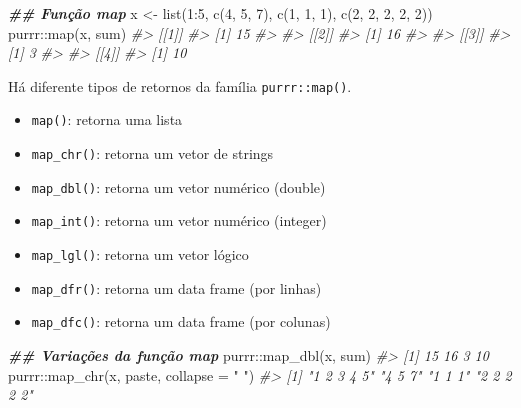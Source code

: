 \documentclass[
]{book}
\newenvironment{Shaded}{\begin{snugshade}}{\end{snugshade}}
\newcommand{\AttributeTok}[1]{\textcolor[rgb]{0.61,0.61,0.61}{#1}}
\newcommand{\CommentTok}[1]{\textcolor[rgb]{0.37,0.37,0.37}{\textit{#1}}}
\newcommand{\DecValTok}[1]{\textcolor[rgb]{0.06,0.06,0.06}{#1}}
\newcommand{\DocumentationTok}[1]{\textcolor[rgb]{0.37,0.37,0.37}{\textbf{\textit{#1}}}}
\newcommand{\FunctionTok}[1]{\textcolor[rgb]{0,0,0}{#1}}
\newcommand{\NormalTok}[1]{#1}
\newcommand{\OtherTok}[1]{\textcolor[rgb]{0.37,0.37,0.37}{#1}}
\newcommand{\SpecialCharTok}[1]{\textcolor[rgb]{0,0,0}{#1}}
\newcommand{\StringTok}[1]{\textcolor[rgb]{0.5,0.5,0.5}{#1}}
\providecommand{\tightlist}{%
  \setlength{\itemsep}{0pt}\setlength{\parskip}{0pt}}
\begin{document}
\begin{Shaded}
\begin{Highlighting}[]
\DocumentationTok{\#\# Função map}
\NormalTok{x }\OtherTok{\textless{}{-}} \FunctionTok{list}\NormalTok{(}\DecValTok{1}\SpecialCharTok{:}\DecValTok{5}\NormalTok{, }\FunctionTok{c}\NormalTok{(}\DecValTok{4}\NormalTok{, }\DecValTok{5}\NormalTok{, }\DecValTok{7}\NormalTok{), }\FunctionTok{c}\NormalTok{(}\DecValTok{1}\NormalTok{, }\DecValTok{1}\NormalTok{, }\DecValTok{1}\NormalTok{), }\FunctionTok{c}\NormalTok{(}\DecValTok{2}\NormalTok{, }\DecValTok{2}\NormalTok{, }\DecValTok{2}\NormalTok{, }\DecValTok{2}\NormalTok{, }\DecValTok{2}\NormalTok{))}
\NormalTok{purrr}\SpecialCharTok{::}\FunctionTok{map}\NormalTok{(x, sum)}
\CommentTok{\#\textgreater{} [[1]]}
\CommentTok{\#\textgreater{} [1] 15}
\CommentTok{\#\textgreater{} }
\CommentTok{\#\textgreater{} [[2]]}
\CommentTok{\#\textgreater{} [1] 16}
\CommentTok{\#\textgreater{} }
\CommentTok{\#\textgreater{} [[3]]}
\CommentTok{\#\textgreater{} [1] 3}
\CommentTok{\#\textgreater{} }
\CommentTok{\#\textgreater{} [[4]]}
\CommentTok{\#\textgreater{} [1] 10}
\end{Highlighting}
\end{Shaded}

Há diferente tipos de retornos da família \texttt{purrr::map()}.

\begin{itemize}
\tightlist
\item
  \texttt{map()}: retorna uma lista
\item
  \texttt{map\_chr()}: retorna um vetor de strings
\item
  \texttt{map\_dbl()}: retorna um vetor numérico (double)
\item
  \texttt{map\_int()}: retorna um vetor numérico (integer)
\item
  \texttt{map\_lgl()}: retorna um vetor lógico
\item
  \texttt{map\_dfr()}: retorna um data frame (por linhas)
\item
  \texttt{map\_dfc()}: retorna um data frame (por colunas)
\end{itemize}

\begin{Shaded}
\begin{Highlighting}[]
\DocumentationTok{\#\# Variações da função map}
\NormalTok{purrr}\SpecialCharTok{::}\FunctionTok{map\_dbl}\NormalTok{(x, sum)}
\CommentTok{\#\textgreater{} [1] 15 16  3 10}
\NormalTok{purrr}\SpecialCharTok{::}\FunctionTok{map\_chr}\NormalTok{(x, paste, }\AttributeTok{collapse =} \StringTok{" "}\NormalTok{)}
\CommentTok{\#\textgreater{} [1] "1 2 3 4 5" "4 5 7"     "1 1 1"     "2 2 2 2 2"}
\end{Highlighting}
\end{Shaded}
\end{document}
